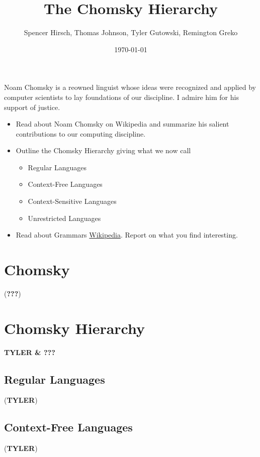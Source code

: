 \documentclass{article}
\begin{document}
\title{The Chomsky Hierarchy}
\author{Spencer Hirsch, Thomas Johnson, Tyler Gutowski, Remington Greko}
\date{\today}

\maketitle

\noindent Noam Chomsky is a reowned linguist whose ideas were recognized and applied
by computer scientists to lay foundations of our discipline. I admire him 
for his support of justice.

\begin{itemize}
    \item Read about Noam Chomsky on Wikipedia and summarize his salient 
          contributions to our computing discipline.
    
    \item Outline the Chomsky Hierarchy giving what we now call
        \begin{itemize}
            \item Regular Languages
            \item Context-Free Languages
            \item Context-Sensitive Languages
            \item Unrestricted Languages
        \end{itemize}

    \item Read about Grammars \href{https://en.wikipedia.org/wiki/Grammar}{Wikipedia}. Report on what you find interesting.
\end{itemize}

\section{Chomsky}
(\textbf{???})

\section{Chomsky Hierarchy}  
\textbf{TYLER \& ???}

\subsection{Regular Languages} (\textbf{TYLER})

\subsection{Context-Free Languages} (\textbf{TYLER})
\end{document}
